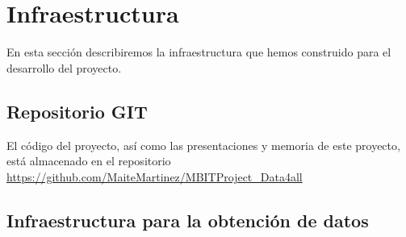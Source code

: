 
\chapter{Infraestructura}
En esta sección describiremos la infraestructura que hemos construido para el desarrollo del proyecto.
\section{Repositorio GIT}
\label{sect:repositorio}
El código del proyecto, así como las presentaciones y memoria de este proyecto, está almacenado en el 
repositorio \url{https://github.com/MaiteMartinez/MBITProject_Data4all}


\section{Infraestructura para la obtención de datos}

